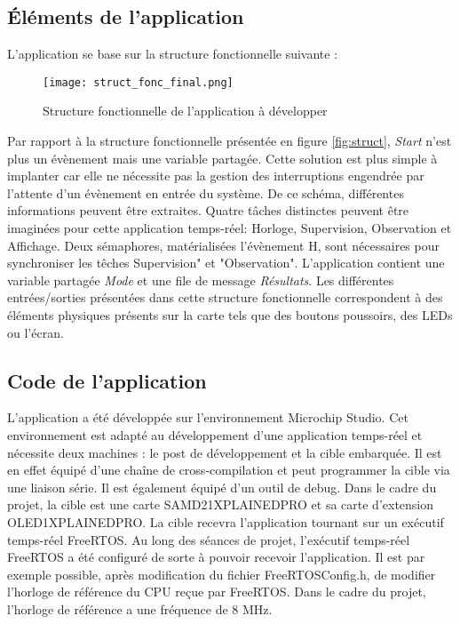 \subsection{Éléments de l'application}

L'application se base sur la structure fonctionnelle suivante :

\begin{figure}[h]
    \centering
    \texttt{[image: struct\_fonc\_final.png]}
    \caption{Structure fonctionnelle de l'application à développer}
    \label{fig:struct_final}
\end{figure}

Par rapport à la structure fonctionnelle présentée en figure \ref{fig:struct}, \textit{Start} n'est plus un évènement mais une variable partagée.
Cette solution est plus simple à implanter car elle ne nécessite pas la gestion des interruptions engendrée par l'attente d'un évènement en entrée du système.
De ce schéma, différentes informations peuvent être extraites.
Quatre tâches distinctes peuvent être imaginées pour cette application temps-réel: Horloge, Supervision, Observation et Affichage.
Deux sémaphores, matérialisées l'évènement H, sont nécessaires pour synchroniser les têches Supervision" et "Observation".
L'application contient une variable partagée \textit{Mode} et une file de message \textit{Résultats}.
Les différentes entrées/sorties présentées dans cette structure fonctionnelle correspondent à des éléments physiques présents sur la carte tels que des boutons poussoirs, des LEDs ou l'écran.

\subsection{Code de l'application}
L'application a été développée sur l'environnement Microchip Studio.
Cet environnement est adapté au développement d'une application temps-réel et nécessite deux machines : le post de développement et la cible embarquée.
Il est en effet équipé d'une chaîne de cross-compilation et peut programmer la cible via une liaison série.
Il est également équipé d'un outil de debug.
Dans le cadre du projet, la cible est une carte SAMD21XPLAINEDPRO et sa carte d'extension OLED1XPLAINEDPRO.
La cible recevra l'application tournant sur un exécutif temps-réel FreeRTOS.
Au long des séances de projet, l'exécutif temps-réel FreeRTOS a été configuré de sorte à pouvoir recevoir l'application.
Il est par exemple possible, après modification du fichier FreeRTOSConfig.h, de modifier l'horloge de référence du CPU reçue par FreeRTOS.
Dans le cadre du projet, l'horloge de référence a une fréquence de 8 MHz.

